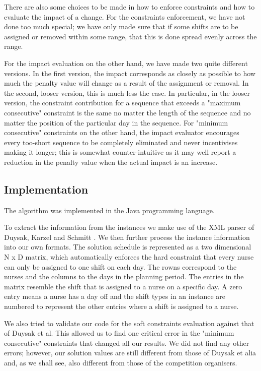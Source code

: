 \documentclass{article}
\begin{document}
There are also some choices to be made in how to enforce constraints and how to evaluate the impact of a change.
For the constraints enforcement, we have not done too much special; we have only made sure that if some shifts are to be assigned or removed within some range, that this is done spread evenly across the range.

For the impact evaluation on the other hand, we have made two quite different versions.
In the first version, the impact corresponds as closely as possible to how much the penalty value will change as a result of the assignment or removal.
In the second, looser version, this is much less the case.
In particular, in the looser version, the constraint contribution for a sequence that exceeds a "maximum consecutive" constraint is the same no matter the length of the sequence and no matter the position of the particular day in the sequence.
For "minimum consecutive" constraints on the other hand, the impact evaluator encourages every too-short sequence to be completely eliminated and never incentivises making it longer; this is somewhat counter-intuitive as it may well report a reduction in the penalty value when the actual impact is an increase.

\subsection{Implementation}

The algorithm was implemented in the Java programming language.

To extract the information from the instances we make use of the XML parser of Duysak, Karzel and Schmitt \cite{DKS}.
We then further process the instance information into our own formats.
The solution schedule is represented as a two dimensional N x D matrix, which automatically enforces the hard constraint that every nurse can only be assigned to one shift on each day.
The rowns correspond to the nurses and the columns to the days in the planning period.
The entries in the matrix resemble the shift that is assigned to a nurse on a specific day.
A zero entry means a nurse has a day off and the shift types in an instance are numbered to represent the other entries where a shift is assigned to a nurse.

We also tried to validate our code for the soft constraints evaluation against that of Duysak et al.
This allowed us to find one critical error in the "minimum consecutive" constraints that changed all our results.
We did not find any other errors; however, our solution values are still different from those of Duysak et alia and, as we shall see, also different from those of the competition organisers.
\end{document}
